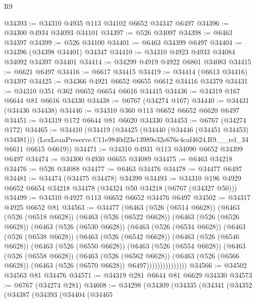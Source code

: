 \begin{lexlean}{R9}
\begin{coremodule}
@34393 := @34310 @4935 @113 @34102 @6652 @34347 @6497
@34396 := @34300 @4934 @34093 @34101
@34397 := @526 @34097
@34398 := @6463 @34397
@34399 := @526 @34100
@34401 := @6463 @34399 @6497
@34404 := @34396 (@34398 @34401) @34347
@34410 := @34310 @4923 @4933 @34084 @34092 @34397 @34401
@34414 := @34299 @4919 @4922 @6801 @34083
@34415 := @6621 @6497
@34416 := @6617 @34415
@34419 := @34414 (@6613 @34416) @34397
@34425 := @34366 @4921 @6652 @6655 @6612 @34416 @34379
@34431 := @34310 @351 @362 @6652 @6654 @6616 @34415
@34436 := @34319 @167 @6644 @81 @6616 @34330
@34438 := @6767 (@34274 @167)
@34440 := @34431 (@34436 @34438)
@34446 := @34310 @360 @113 @6652 @6652 @6620 @6497
@34451 := @34319 @172 @6644 @81 @6620 @34330
@34453 := @6767 (@34274 @172)
@34465 := @34410
    (@34419
      (@34425 (@34440 (@34446 (@34451 @34453) @34381)))
      (LexLeanPreserve.C11e9840d23e13989e32e676c4caf4624.R9.__rel_34 @6611 @6615 @6619))
@34471 := @34310 @4931 @113 @34090 @6652 @34399 @6497
@34474 := @34300 @4930 @6655 @34089
@34475 := @6463 @34218
@34476 := @526 @34088
@34477 := @6463 @34476
@34478 := @34477 @6497
@34481 := @34474 (@34475 @34478) @34399
@34493 := @34310 @196 @4929 @6652 @6654 @34218 @34478 (@34324 @50 @34218 (@6767 (@34327 @50)))
@34499 := @34310 @4927 @113 @6652 @6652 @34476 @6497
@34502 := @34317 @4925 @6652 @81
@34563 := @34477
    (@6463
      (@526 (@6514 @6628))
      (@6463
        (@526 (@6518 @6628))
        (@6463
          (@526 (@6522 @6628))
          (@6463
            (@526 (@6526 @6628))
            (@6463
              (@526 (@6530 @6628))
              (@6463
                (@526 (@6534 @6628))
                (@6463
                  (@526 (@6538 @6628))
                  (@6463
                    (@526 (@6542 @6628))
                    (@6463
                      (@526 (@6546 @6628))
                      (@6463
                        (@526 (@6550 @6628))
                        (@6463
                          (@526 (@6554 @6628))
                          (@6463
                            (@526 (@6558 @6628))
                            (@6463
                              (@526 (@6562 @6628))
                              (@6463
                                (@526 (@6566 @6628))
                                (@6463 (@526 (@6570 @6628)) @6497)))))))))))))))
@34566 := @34502 @34563 @81 @34476
@34571 := @34319 @281 @6644 @81 @6629 @34330
@34573 := @6767 (@34274 @281)
@34608 := @34298
    (@34309
      (@34335
        (@34341
          (@34352
            (@34387
              (@34393
                (@34404
                  (@34465

\end{coremodule}
\end{lexlean}
